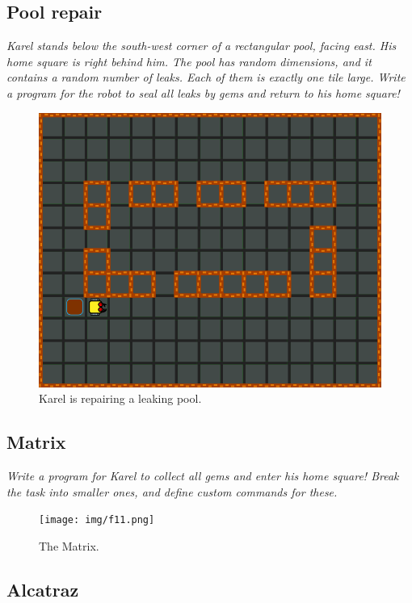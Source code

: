 \subsection{Pool repair}

{\em Karel stands below the south-west corner of a rectangular pool, facing east. His home square is right behind him. The pool has random dimensions, and it contains a random number of leaks. Each of them is exactly one tile large. Write a program for the robot to seal all leaks by gems and return to his home square!}\\[-9mm]

\begin{figure}[!ht]
\begin{center}
\includegraphics[height=0.4\textwidth]{img/f04.png}
\end{center}
\vspace{-4mm}
\caption{Karel is repairing a leaking pool.}
\label{fig:f04}
\vspace{-1.4cm}
\end{figure}
\newpage

\subsection{Matrix}

{\em Write a program for Karel to collect all gems and enter his home square! Break the task into smaller ones, and define custom commands for these.}\\[-7mm]

\begin{figure}[!ht]
\begin{center}
\texttt{[image: img/f11.png]}
\end{center}
\vspace{-4mm}
\caption{The Matrix.}
\label{fig:f11}
\end{figure}
\vspace{-1cm}

\subsection{Alcatraz}

